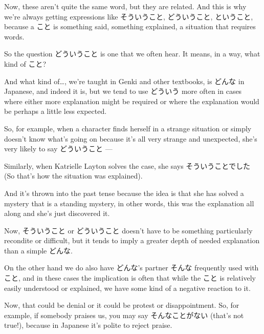 Now, these aren't quite the same word, but they are related. And this is why we're always getting expressions like そういうこと, どういうこと, ということ, because a こと is something said, something explained, a situation that requires words.

So the question どういうこと is one that we often hear. It means, in a way, what kind of こと?

{}

And what kind of\ldots{}, we're taught in Genki and other textbooks, is どんな in Japanese, and indeed it is, but we tend to use どういう more often in cases where either more explanation might be required or where the explanation would be perhaps a little less expected.

\thinrule

So, for example, when a character finds herself in a strange situation or simply doesn't know what's going on because it's all very strange and unexpected, she's very likely to say どういうこと --- 

Similarly, when Katrielle Layton solves the case, she says そういうことでした (So that's how the situation was explained).

{}

And it's thrown into the past tense because the idea is that she has solved a mystery that is a standing mystery, in other words, this was the explanation all along and she's just discovered it.

Now, そういうこと or どういうこと doesn't have to be something particularly recondite or difficult, but it tends to imply a greater depth of needed explanation than a simple どんな.

\stopsectionlevel

\startsectionlevel[title={そんなこと},reference={そんなこと}]

On the other hand we do also have どんな's partner そんな frequently used with こと, and in these cases the implication is often that while the こと is relatively easily understood or explained, we have some kind of a negative reaction to it.

{}

Now, that could be denial or it could be protest or disappointment. So, for example, if somebody praises us, you may say そんなことがない (that's not true!), because in Japanese it's polite to reject praise.


